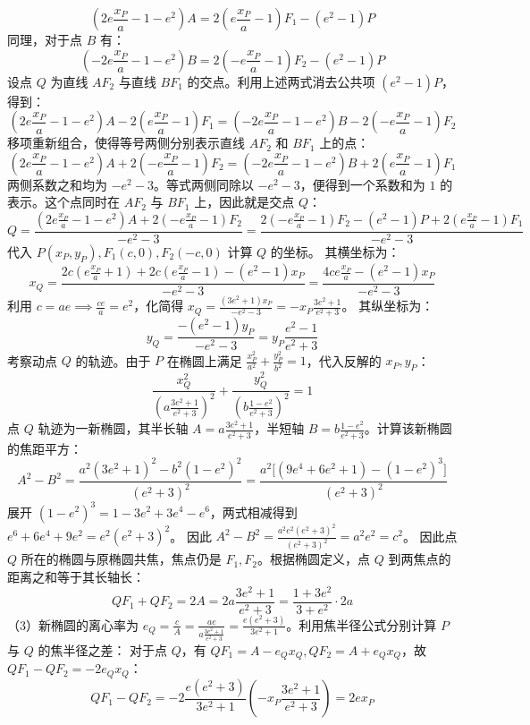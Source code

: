 \begin{solution}
$$\left(2e\frac{x_P}{a} - 1 - e^2\right) A = 2\left(e\frac{x_P}{a} - 1\right) F_1 - (e^2-1) P$$
同理，对于点 $B$ 有：
$$\left(-2e\frac{x_P}{a} - 1 - e^2\right) B = 2\left(-e\frac{x_P}{a} - 1\right) F_2 - (e^2-1) P$$
设点 $Q$ 为直线 $AF_2$ 与直线 $BF_1$ 的交点。利用上述两式消去公共项 $(e^2-1)P$，得到：
$$\left(2e\frac{x_P}{a} - 1 - e^2\right) A - 2\left(e\frac{x_P}{a} - 1\right) F_1 = \left(-2e\frac{x_P}{a} - 1 - e^2\right) B - 2\left(-e\frac{x_P}{a} - 1\right) F_2$$
移项重新组合，使得等号两侧分别表示直线 $AF_2$ 和 $BF_1$ 上的点：
$$\left(2e\frac{x_P}{a} - 1 - e^2\right) A + 2\left(-e\frac{x_P}{a} - 1\right) F_2 = \left(-2e\frac{x_P}{a} - 1 - e^2\right) B + 2\left(e\frac{x_P}{a} - 1\right) F_1$$
两侧系数之和均为 $-e^2 - 3$。等式两侧同除以 $-e^2 - 3$，便得到一个系数和为 $1$ 的表示。这个点同时在 $AF_2$ 与 $BF_1$ 上，因此就是交点 $Q$：
$$Q = \frac{\left(2e\frac{x_P}{a} - 1 - e^2\right) A + 2\left(-e\frac{x_P}{a} - 1\right) F_2}{-e^2 - 3} = \frac{2\left(-e\frac{x_P}{a} - 1\right) F_2 - (e^2-1) P + 2\left(e\frac{x_P}{a} - 1\right) F_1}{-e^2 - 3}$$
代入 $P(x_P, y_P), F_1(c,0), F_2(-c,0)$ 计算 $Q$ 的坐标。
其横坐标为：
$$x_Q = \frac{2c(e\frac{x_P}{a} + 1) + 2c(e\frac{x_P}{a} - 1) - (e^2-1)x_P}{-e^2-3} = \frac{4ce\frac{x_P}{a} - (e^2-1)x_P}{-e^2-3}$$
利用 $c = ae \implies \frac{ce}{a} = e^2$，化简得 $x_Q = \frac{(3e^2+1)x_P}{-e^2-3} = -x_P \frac{3e^2+1}{e^2+3}$。
其纵坐标为：
$$y_Q = \frac{-(e^2-1)y_P}{-e^2-3} = y_P \frac{e^2-1}{e^2+3}$$
考察动点 $Q$ 的轨迹。由于 $P$ 在椭圆上满足 $\frac{x_P^2}{a^2} + \frac{y_P^2}{b^2} = 1$，代入反解的 $x_P, y_P$：
$$\frac{x_Q^2}{\left(a\frac{3e^2+1}{e^2+3}\right)^2} + \frac{y_Q^2}{\left(b\frac{1-e^2}{e^2+3}\right)^2} = 1$$
点 $Q$ 轨迹为一新椭圆，其半长轴 $A = a\frac{3e^2+1}{e^2+3}$，半短轴 $B = b\frac{1-e^2}{e^2+3}$。计算该新椭圆的焦距平方：
$$A^2 - B^2 = \frac{a^2(3e^2+1)^2 - b^2(1-e^2)^2}{(e^2+3)^2} = \frac{a^2\big[(9e^4+6e^2+1) - (1-e^2)^3\big]}{(e^2+3)^2}$$
展开 $(1-e^2)^3 = 1 - 3e^2 + 3e^4 - e^6$，两式相减得到 $e^6 + 6e^4 + 9e^2 = e^2(e^2+3)^2$。
因此 $A^2 - B^2 = \frac{a^2 e^2 (e^2+3)^2}{(e^2+3)^2} = a^2 e^2 = c^2$。
因此点 $Q$ 所在的椭圆与原椭圆共焦，焦点仍是 $F_1, F_2$。根据椭圆定义，点 $Q$ 到两焦点的距离之和等于其长轴长：
$$QF_1 + QF_2 = 2A = 2a \frac{3e^2+1}{e^2+3} = \frac{1+3e^2}{3+e^2} \cdot 2a$$
（3）新椭圆的离心率为 $e_Q = \frac{c}{A} = \frac{ae}{a\frac{3e^2+1}{e^2+3}} = \frac{e(e^2+3)}{3e^2+1}$。利用焦半径公式分别计算 $P$ 与 $Q$ 的焦半径之差：
对于点 $Q$，有 $QF_1 = A - e_Q x_Q, QF_2 = A + e_Q x_Q$，故 $QF_1 - QF_2 = -2 e_Q x_Q$：
$$QF_1 - QF_2 = -2 \frac{e(e^2+3)}{3e^2+1} \left(-x_P \frac{3e^2+1}{e^2+3}\right) = 2ex_P$$

\end{solution}
